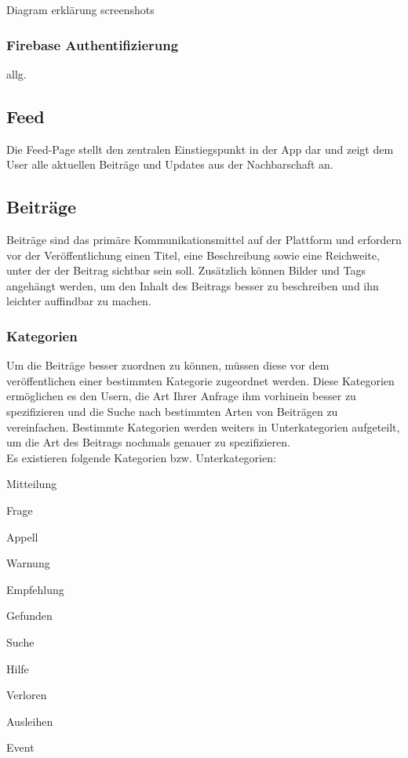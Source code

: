 Diagram
erklärung
screenshots


\subsubsection{Firebase Authentifizierung}

allg.


\subsection{Feed}
Die Feed-Page stellt den zentralen Einstiegspunkt in der App dar und zeigt dem User alle aktuellen Beiträge und Updates aus der Nachbarschaft an.

\subsection{Beiträge}
Beiträge sind das primäre Kommunikationsmittel auf der Plattform und erfordern vor der Veröffentlichung einen Titel, eine Beschreibung sowie eine Reichweite, unter der der Beitrag sichtbar sein soll. Zusätzlich können Bilder und Tags angehängt werden, um den Inhalt des Beitrags besser zu beschreiben und ihn leichter auffindbar zu machen.

\subsubsection{Kategorien}
Um die Beiträge besser zuordnen zu können, müssen diese vor dem veröffentlichen einer bestimmten Kategorie zugeordnet werden. Diese Kategorien ermöglichen es den Usern, die Art Ihrer Anfrage ihm vorhinein besser zu spezifizieren und die Suche nach bestimmten Arten von Beiträgen zu vereinfachen. Bestimmte Kategorien werden weiters in Unterkategorien aufgeteilt, um die Art des Beitrags nochmals genauer zu spezifizieren.
\\
Es existieren folgende Kategorien bzw. Unterkategorien:

\begin{compactitem}
  \item Mitteilung
  \begin{compactitem}
    \item Frage
    \item Appell
    \item Warnung
    \item Empfehlung
    \item Gefunden
  \end{compactitem}
  \item Suche
  \begin{compactitem}
    \item Hilfe
    \item Verloren
  \end{compactitem}
  \item Ausleihen
  \item Event
\end{compactitem}

